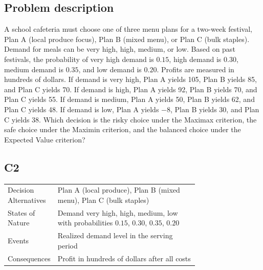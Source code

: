 

	

		\subsection*{Problem description}
		A school cafeteria must choose one of three menu plans for a two-week festival, Plan A (local produce focus),
		Plan B (mixed menu), or Plan C (bulk staples). Demand for meals can be very high, high, medium, or low. Based on past festivals, the probability of very high demand is $0.15$, high demand is $0.30$, medium demand is $0.35$, and low demand is $0.20$. Profits are measured in hundreds of dollars. If demand is very high, Plan A yields 105, Plan B yields 85, and Plan C yields 70. If demand is high, Plan A yields 92, Plan B yields 70, and Plan C yields 55. If demand is medium, Plan A yields 50, Plan B yields 62, and Plan C yields 48. If demand is low, Plan A yields $-8$, Plan B yields 30, and Plan C yields 38. Which decision is the risky choice under the Maximax criterion, the safe choice under the Maximin criterion, and the balanced choice under the Expected Value criterion?

		\subsection*{C2}
		\begin{center}
			\begin{tabular}{l p{0.74\linewidth}}
				\toprule
				Decision Alternatives & Plan A (local produce), Plan B (mixed menu), Plan C (bulk staples) \\
				States of Nature & Demand very high, high, medium, low with probabilities $0.15$, $0.30$, $0.35$, $0.20$ \\
				Events & Realized demand level in the serving period \\
				Consequences & Profit in hundreds of dollars after all costs \\
				\bottomrule
			\end{tabular}
		\end{center}

